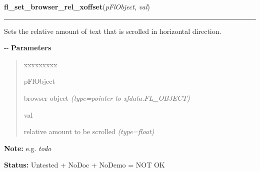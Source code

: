 \hspace{.8\funcindent}\begin{boxedminipage}{\funcwidth}

    \raggedright \textbf{fl\_set\_browser\_rel\_xoffset}(\textit{pFlObject}, \textit{val})

    \vspace{-1.5ex}

    \rule{\textwidth}{0.5\fboxrule}
\setlength{\parskip}{2ex}

Sets the relative amount of text that is scrolled in horizontal
direction.

-{}-
\setlength{\parskip}{1ex}
      \textbf{Parameters}
      \vspace{-1ex}

      \begin{quote}
        \begin{Ventry}{xxxxxxxxx}

          \item[pFlObject]


browser object
            {\it (type=pointer to xfdata.FL\_OBJECT)}

          \item[val]


relative amount to be scrolled
            {\it (type=float)}

        \end{Ventry}

      \end{quote}

\textbf{Note:} 
e.g. \emph{todo}


\textbf{Status:} 
Untested + NoDoc + NoDemo = NOT OK


    \end{boxedminipage}

    \label{xformslib:flbrowser:fl_get_browser_yoffset}

    \vspace{0.5ex}

